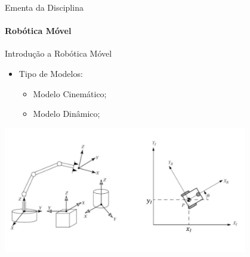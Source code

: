 \documentclass[aspectratio=169]{beamer}
\begin{document}
\begin{frame}[c]{Ementa da Disciplina}
	\framesubtitle{Robótica Móvel}
	\begin{block}{Introdução a Robótica Móvel}
	\end{block}

	\begin{itemize}
		\item Tipo de Modelos:
		      \begin{itemize}
			      \item Modelo Cinemático;
			      \item Modelo Dinâmico;
		      \end{itemize}
	\end{itemize}
	\begin{center}
		\includegraphics[width=0.8\textwidth]{./images/mecanismos.jpg}
	\end{center}
\end{frame}
\end{document}
